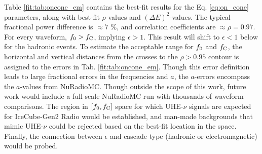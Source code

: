 \documentclass[amsmath,amssymb,aps,prd,10pt,twocolumn]{revtex4}
\begin{document}
Table \ref{fit:tab:oncone_em} contains the best-fit results for the Eq. \ref{eq:on_cone} parameters, along with best-fit $\rho$-values and $(\Delta E)^2$-values.  The typical fractional power difference is $\approx 7$ \%, and correlation coefficients are $\approx \rho = 0.97$.  For every waveform, $f_{\rm 0} > f_{\rm C}$, implying $\epsilon>1$.  This result will shift to $\epsilon<1$ below for the hadronic events.  To estimate the acceptable range for $f_{\rm 0}$ and $f_{\rm C}$, the horizontal and vertical distances from the crosses to the $\rho > 0.95$ contour is assigned to the errors in Tab. \ref{fit:tab:oncone_em}.  Though this error definition leads to large fractional errors in the frequencies and $a$, the $a$-errors encompass the $a$-values from NuRadioMC.  Though outside the scope of this work, future work would include a full-scale NuRadioMC run with thousands of waveform comparisons.  The region in $[f_{\rm 0},f_{\rm C}]$ space for which UHE-$\nu$ signals are expected for IceCube-Gen2 Radio would be established, and man-made backgrounds that mimic UHE-$\nu$ could be rejected based on the best-fit location in the space.  Finally, the connection between $\epsilon$ and cascade type (hadronic or electromagnetic) would be probed.
\end{document}
